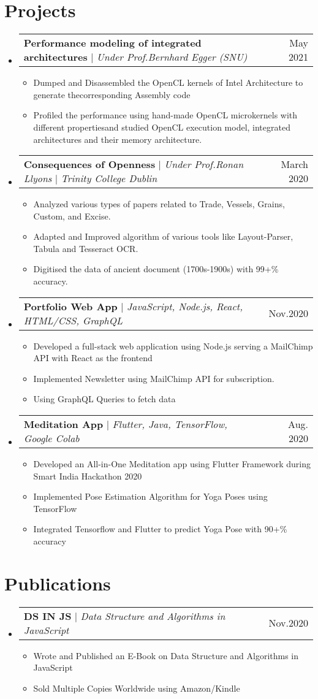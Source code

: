 \documentclass[letterpaper,11pt]{article}
\makeatletter
\newcommand{\resumeItem}[1]{
  \item\small{
    {#1 \vspace{-2pt}}
  }
}
\newcommand{\resumeProjectHeading}[2]{
    \item
    \begin{tabular*}{0.97\textwidth}{l@{\extracolsep{\fill}}r}
      \small#1 & #2 \\
    \end{tabular*}\vspace{-7pt}
}
\newcommand{\resumeSubHeadingListStart}{\begin{itemize}[leftmargin=0.15in, label={}]}
\newcommand{\resumeSubHeadingListEnd}{\end{itemize}}
\newcommand{\resumeItemListStart}{\begin{itemize}}
\newcommand{\resumeItemListEnd}{\end{itemize}\vspace{-5pt}}
\makeatother
\begin{document}
\section{Projects}
    \resumeSubHeadingListStart
         \resumeProjectHeading
          {\textbf{Performance modeling of integrated architectures} $|$ \emph{Under Prof.Bernhard Egger (SNU)}}{May 2021}
          \resumeItemListStart
            \resumeItem{Dumped and Disassembled the OpenCL kernels of Intel Architecture to generate the\newline corresponding Assembly code}
            \resumeItem{Profiled the performance using hand-made OpenCL microkernels with different properties\newline and studied OpenCL execution model, integrated architectures and their memory architecture.}
          \resumeItemListEnd
      \resumeProjectHeading
          {\textbf{Consequences of Openness} $|$ \emph{Under Prof.Ronan Llyons} $|$ \emph{Trinity College Dublin}}{March 2020}
          \resumeItemListStart
            \resumeItem{Analyzed various types of papers related to Trade, Vessels, Grains, Custom, and Excise.}
            \resumeItem{Adapted and Improved algorithm of various tools like Layout-Parser, Tabula and Tesseract OCR. }
            \resumeItem{Digitised the data of ancient document (1700s-1900s)  with 99+\% accuracy.}
          \resumeItemListEnd
      \resumeProjectHeading
          {\textbf{Portfolio Web App} $|$ \emph{JavaScript, Node.js, React, HTML/CSS, GraphQL}}{Nov.2020}
          \resumeItemListStart
            \resumeItem{Developed a full-stack web application using Node.js serving a MailChimp API with React as the frontend}
            \resumeItem{Implemented Newsletter using MailChimp API for subscription.}
            \resumeItem{Using GraphQL Queries to fetch data}
          \resumeItemListEnd
     \resumeProjectHeading
          {\textbf{Meditation App} $|$ \emph{Flutter, Java, TensorFlow, Google Colab}}{Aug. 2020}
          \resumeItemListStart
            \resumeItem{Developed an All-in-One Meditation app using Flutter Framework during Smart India Hackathon 2020}
            \resumeItem{Implemented Pose Estimation Algorithm for Yoga Poses using TensorFlow}
            \resumeItem{Integrated Tensorflow and Flutter to predict Yoga Pose with 90+\% accuracy}
          \resumeItemListEnd


    \resumeSubHeadingListEnd

\section{Publications}
    \resumeSubHeadingListStart
      \resumeProjectHeading
          {\textbf{DS IN JS} $|$ \emph{Data Structure and Algorithms in JavaScript}}{Nov.2020}
          \resumeItemListStart
            \resumeItem{Wrote and Published an E-Book on Data Structure and Algorithms in JavaScript}
            \resumeItem{Sold Multiple Copies Worldwide using Amazon/Kindle}
          \resumeItemListEnd
            \resumeSubHeadingListEnd
\end{document}
